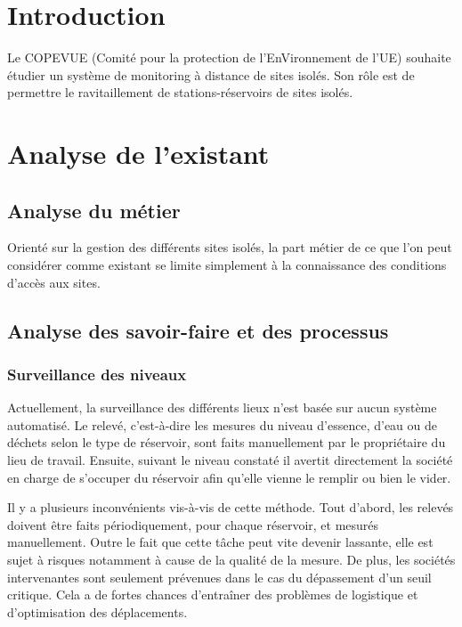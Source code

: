 \documentclass{mise_en_page}
\begin{document}
\maketitle

\begin{historique}
\end{historique}

\newpage

\tableofcontents

\section{Introduction}
Le COPEVUE (Comité pour la protection de l’EnVironnement de l’UE)
souhaite étudier un système de monitoring à distance de sites isolés.
Son rôle est de permettre le ravitaillement de stations-réservoirs de
sites isolés.

\section{Analyse de l’existant}
\subsection{Analyse du métier}
Orienté sur la gestion des différents sites isolés, la part métier de ce
que l’on peut considérer comme existant se limite simplement à la
connaissance des conditions d’accès aux sites.

\subsection{Analyse des savoir-faire et des processus}
\subsubsection{Surveillance des niveaux}
Actuellement, la surveillance des différents lieux n’est basée sur aucun
système automatisé. Le relevé, c’est-à-dire les mesures du niveau
d’essence, d’eau ou de déchets selon le type de réservoir, sont faits
manuellement par le propriétaire du lieu de travail. Ensuite, suivant
le niveau constaté il avertit directement la société en charge de
s’occuper du réservoir afin qu’elle vienne le remplir ou bien le vider.

Il y a plusieurs inconvénients vis-à-vis de cette méthode. Tout d’abord,
les relevés doivent être faits périodiquement, pour chaque réservoir,
et mesurés manuellement. Outre le fait que cette tâche peut vite
devenir lassante, elle est sujet à risques notamment à cause de la
qualité de la mesure. De plus, les sociétés intervenantes sont
seulement prévenues dans le cas du dépassement d’un seuil critique.
Cela a de fortes chances d'entraîner des problèmes de
logistique et d’optimisation des déplacements. 
\end{document}
